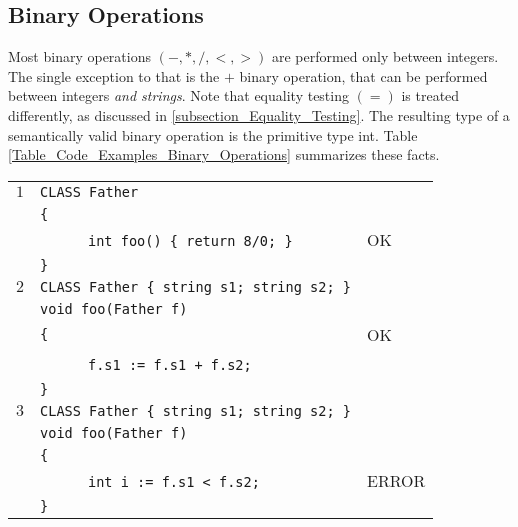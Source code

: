 \documentclass{article}
\begin{document}
\subsection{Binary Operations}
\label{subsection_Binary_Operations}
Most binary operations $(-,*,/,<,>)$ are performed only between integers.
The single exception to that is the $+$ binary operation,
that can be performed between integers \textit{and strings}.
Note that equality testing $(=)$ is treated differently,
as discussed in \ref{subsection_Equality_Testing}.
The resulting type of a semantically valid binary operation is the primitive type int.
Table \ref{Table_Code_Examples_Binary_Operations} summarizes these facts.
\begin{table}[h]
\centering
\begin{tabular}{|l|l|l|}
\hline
 $1$ & \verb"CLASS Father"                     &    \\
     & \verb"{"                                &    \\
     & ~ ~ ~ ~\verb"int foo() { return 8/0; }" & OK \\
     & \verb"}"                                &    \\
\hline
 $2$ & \verb"CLASS Father { string s1; string s2; }" &    \\
     & \verb"void foo(Father f)"                     &    \\
     & \verb"{"                                      & OK \\
     & ~ ~ ~ ~\verb"f.s1 := f.s1 + f.s2;"            &    \\
     & \verb"}"                                      &    \\
\hline
 $3$ & \verb"CLASS Father { string s1; string s2; }" &       \\
     & \verb"void foo(Father f)"                     &       \\
     & \verb"{"                                      &       \\
     & ~ ~ ~ ~\verb"int i := f.s1 < f.s2;"           & ERROR \\
     & \verb"}"                                      &       \\

\end{tabular}
\end{table}
\end{document}
